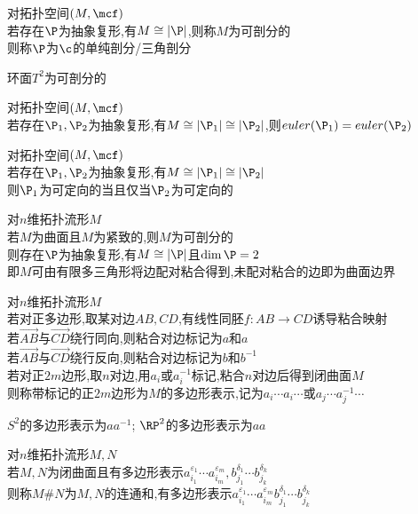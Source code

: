 \begin{dingyi}
对拓扑空间$(M,\mcf)$\\ 
若存在$\P$为抽象复形,有$M\cong|\P|$,则称$M$为可剖分的\\
则称$\P$为$\c$的单纯剖分/三角剖分
\end{dingyi}

\begin{zhu}
环面$T^2$为可剖分的
\end{zhu}

\begin{dingli}
对拓扑空间$(M,\mcf)$\\
若存在$\P_1,\P_2$为抽象复形,有$M\cong|\P_1|\cong|\P_2|$,则$euler(\P_1)=euler(\P_2)$
\end{dingli}

\begin{dingli}
对拓扑空间$(M,\mcf)$\\
若存在$\P_1,\P_2$为抽象复形,有$M\cong|\P_1|\cong|\P_2|$\\
则$\P_1$为可定向的当且仅当$\P_2$为可定向的
\end{dingli}

\begin{dingli}
对$n$维拓扑流形$M$\\
若$M$为曲面且$M$为紧致的,则$M$为可剖分的\\
则存在$\P$为抽象复形,有$M\cong|\P|$且$\dim\P=2$\\
即$M$可由有限多三角形将边配对粘合得到,未配对粘合的边即为曲面边界
\end{dingli}

\begin{dingyi}
对$n$维拓扑流形$M$\\
若对正多边形,取某对边$AB,CD$,有线性同胚$f:AB\to CD$诱导粘合映射\\
若$\overrightarrow{AB}$与$\overrightarrow{CD}$绕行同向,则粘合对边标记为$a$和$a$\\
若$\overrightarrow{AB}$与$\overrightarrow{CD}$绕行反向,则粘合对边标记为$b$和$b^{-1}$\\
若对正$2m$边形,取$n$对边,用$a_i$或$a_{i}^{-1}$标记,粘合$n$对边后得到闭曲面$M$\\
则称带标记的正$2m$边形为$M$的多边形表示,记为$a_{i}\cdots a_{i}\cdots$或$a_{j}\cdots a_{j}^{-1}\cdots$
\end{dingyi}

\begin{zhu}
$S^2$的多边形表示为$aa^{-1}$; $\RP^2$的多边形表示为$aa$
\end{zhu}

\begin{dingyi}
对$n$维拓扑流形$M,N$\\
若$M,N$为闭曲面且有多边形表示$a_{i_{1}}^{\varepsilon_{1}}\cdots a_{i_{m}}^{\varepsilon_{m}},b_{j_{1}}^{\delta_{1}}\cdots b_{j_{k}}^{\delta_{k}}$\\
则称$M\#N$为$M,N$的连通和,有多边形表示$a_{i_{1}}^{\varepsilon_{1}}\cdots a_{i_{m}}^{\varepsilon_{m}}b_{j_{1}}^{\delta_{1}}\cdots b_{j_{k}}^{\delta_{k}}$
\end{dingyi}

